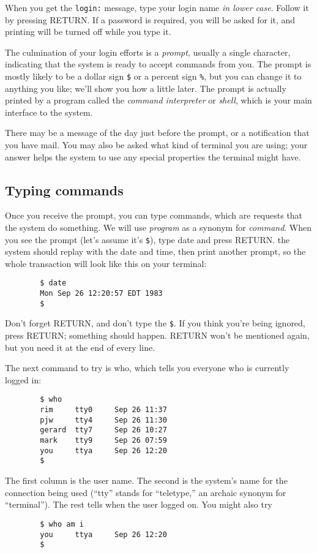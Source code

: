 When you get the \verb=login:= message, type your login name \textit{in lower
  case}. Follow it by pressing RETURN. If a password is required, you will be
asked for it, and printing will be turned off while you type it.

The culmination of your login efforts is a \textit{prompt}, usually a single
character, indicating that the system is ready to accept commands from you. The
prompt is mostly likely to be a dollar sign \verb=$= or a percent sign \verb=%=,
but you can change it to anything you like; we'll show you how a little
later. The prompt is actually printed by a program called the \textit{command
  interpreter} or \textit{shell}, which is your main interface to the system.

There may be a message of the day just before the prompt, or a notification that
you have mail. You may also be asked what kind of terminal you are using; your
answer helps the system to use any special properties the terminal might have.


\subsection{Typing commands}

Once you receive the prompt, you can type commands, which are requests that the
system do something. We will use \textit{program} as a synonym for
\textit{command}. When you see the prompt (let's assume it's \verb=$=), type
date and press RETURN. the system should replay with the date and time, then
print another prompt, so the whole transaction will look like this on your
terminal:
\begin{verbatim}
        $ date
        Mon Sep 26 12:20:57 EDT 1983
        $
\end{verbatim}
Don't forget RETURN, and don't type the \verb=$=. If you think you're being
ignored, press RETURN; something should happen. RETURN won't be mentioned again,
but you need it at the end of every line.

The next command to try is who, which tells you everyone who is currently logged
in:
\begin{verbatim}
        $ who
        rim     tty0     Sep 26 11:37
        pjw     tty4     Sep 26 11:30
        gerard  tty7     Sep 26 10:27
        mark    tty9     Sep 26 07:59
        you     ttya     Sep 26 12:20
        $
\end{verbatim}
The first column is the user name. The second is the system's name for the
connection being used (``tty'' stands for ``teletype,'' an archaic synonym for
``terminal''). The rest tells when the user logged on. You might also try
\begin{verbatim}
        $ who am i
        you     ttya     Sep 26 12:20
        $
\end{verbatim}

